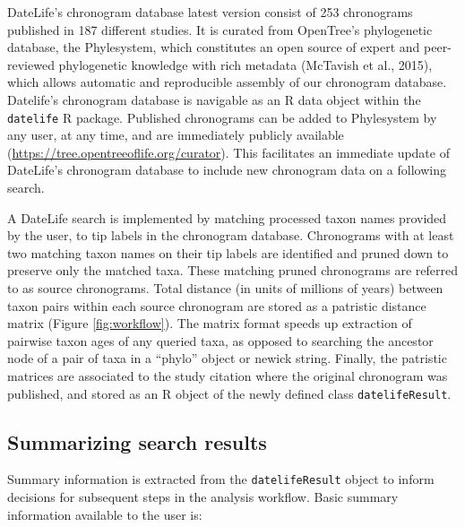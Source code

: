 \documentclass[
  english,
  man]{apa6}
\begin{document}
DateLife's chronogram database latest version consist of 253 chronograms published in 187 different studies. It is curated from OpenTree's phylogenetic database, the Phylesystem, which constitutes an open source of expert and peer-reviewed phylogenetic knowledge with rich metadata (McTavish et al., 2015), which allows automatic and reproducible assembly of our chronogram database. Datelife's chronogram database is navigable as an R data object within the \texttt{datelife} R package.
Published chronograms can be added to Phylesystem by any user, at any time, and are immediately publicly available (\url{https://tree.opentreeoflife.org/curator}). This facilitates an immediate update of DateLife's chronogram database to include new chronogram data on a following search.

A DateLife search is implemented by matching processed taxon names provided by the user, to tip labels in the chronogram database. Chronograms with at least two matching taxon names on their tip labels are identified and pruned down to preserve only the matched taxa.
These matching pruned chronograms are referred to as source chronograms.
Total distance (in units of millions of years) between taxon pairs within each source chronogram are stored as a patristic distance matrix (Figure \ref{fig:workflow}).
The matrix format speeds up extraction of pairwise taxon ages of any queried taxa, as opposed to searching the ancestor node of a pair of taxa in a ``phylo'' object or newick string.
Finally, the patristic matrices are associated to the study citation where the original chronogram was published, and stored as an R object of the newly defined class \texttt{datelifeResult}.

\hypertarget{summarizing-search-results}{%
\subsection{Summarizing search results}\label{summarizing-search-results}}

Summary information is extracted from the \texttt{datelifeResult} object to inform decisions for subsequent steps in the analysis workflow. Basic summary information available to the user is:
\end{document}
